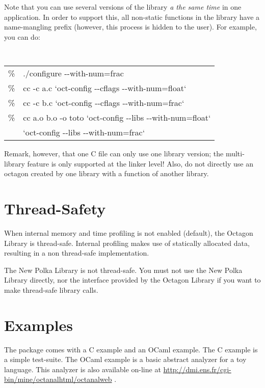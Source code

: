 \documentclass[twosides]{report}
\begin{document}
\bigskip

Note that you can use several versions of the library {\it a the same time}
in one application.
In order to support this, all non-static functions in the library have
a name-mangling prefix (however, this process is hidden to the user).
For example, you can do:

\hspace*{0.2cm}
{\tt
\begin{tabular}{ll}
\%\quad&./configure -{}-with-num=frac\\
\%&cc -c a.c `oct-config -{}-cflags -{}-with-num=float`\\
\%&cc -c b.c `oct-config -{}-cflags -{}-with-num=frac`\\
\%&cc a.o b.o -o toto `oct-config -{}-libs -{}-with-num=float`
\\&\qquad`oct-config -{}-libs -{}-with-num=frac`
\end{tabular}
}

Remark, however, that one C file can only use one library version; the
multi-library feature is only supported at the linker level!
Also, do not directly use an octagon created by one library with a function
of another library.



\section{Thread-Safety}

When internal memory and time profiling is not enabled
(default), the Octagon Library is thread-safe.
Internal profiling makes use of statically allocated data, resulting in
a non thread-safe implementation.

The New Polka Library is not thread-safe.
You must not use the New Polka Library directly, nor the interface provided
by the Octagon Library if you want to make thread-safe library calls.



\section{Examples}

The package comes with a C example and an OCaml example.
The C example is a simple test-suite. The OCaml example is a basic
abstract analyzer for a toy language.
This analyzer is also available on-line at 
\url{http://dmi.ens.fr/cgi-bin/mine/octanalhtml/octanalweb} .


\cleardoublepage
\end{document}
